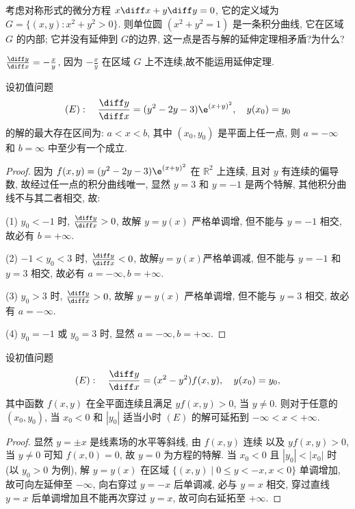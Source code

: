 \begin{exercise}
  考虑对称形式的微分方程 $x\diff x+y\diff y=0$,
  它的定义域为 $G=\{(x,y):x^2+y^2>0\}$. 则单位圆 $(x^2+y^2=1)$ 是一条积分曲线,
  它在区域 $G$ 的内部; 它并没有延伸到 $G$的边界, 这一点是否与解的延伸定理相矛盾?为什么?
\end{exercise}

\begin{solve}
  $\frac{\diff y}{\diff x}=-\frac{x}{y}$, 因为 $-\frac{x}{y}$ 在区域 $G$ 上不连续,故不能运用延伸定理.
\end{solve}



\begin{exercise}
  设初值问题
  \[(E):\quad \frac{\diff y}{\diff x}=(y^2-2y-3)\e^{(x+y)^2},\quad y(x_0)=y_0\]
  的解的最大存在区间为: $a<x<b$, 其中 $(x_0,y_0)$ 是平面上任一点,
  则 $a=-\infty$ 和 $b=\infty$ 中至少有一个成立.
\end{exercise}

\begin{proof}
  因为 $f(x,y)=(y^2-2y-3)\e^{(x+y)^2}$ 在 $\mathbb{R}^2$ 上连续,
  且对 $y$ 有连续的偏导数, 故经过任一点的积分曲线唯一, 显然 $y=3$ 和 $y=-1$ 是两个特解,
  其他积分曲线不与其二者相交, 故:

  (1) $y_0<-1$ 时, $\frac{\diff y}{\diff x}>0$, 故解 $y=y(x)$ 严格单调增, 
  但不能与 $y=-1$ 相交, 故必有 $b=+\infty$.

  (2) $-1<y_0<3$ 时, $\frac{\diff y}{\diff x}<0$, 故解$y=y(x)$严格单调减,
  但不能与 $y=-1$ 和 $y=3$ 相交, 故必有 $a=-\infty,b=+\infty$.

  (3) $y_0>3$ 时, $\frac{\diff y}{\diff x}>0$, 故解 $y=y(x)$ 严格单调增,
  但不能与 $y=3$ 相交, 故必有 $a=-\infty$.

  (4) $y_0=-1$ 或 $y_0=3$ 时, 显然 $a=-\infty,b=+\infty$.
\end{proof}



\begin{exercise}
  设初值问题
  \[(E):\quad \frac{\diff y}{\diff x}=(x^2-y^2)f(x,y),\quad y(x_0)=y_0,\]
  其中函数 $f(x,y)$ 在全平面连续且满足 $yf(x,y)>0$, 当 $y\neq 0$.
  则对于任意的 $(x_0,y_0)$,
  当 $x_0<0$ 和 $|y_0|$ 适当小时 $(E)$ 的解可延拓到 $-\infty<x<+\infty$.
\end{exercise}

\begin{proof}
  显然 $y=\pm x$ 是线素场的水平等斜线, 由 $f(x,y)$ 连续
  以及 $yf(x,y)>0$, 当 $y\neq 0$ 可知 $f(x,0)=0$,
  故 $y=0$ 为方程的特解. 当 $x_0<0$ 且 $|y_0|<|x_0|$ 时 (以 $y_0>0$ 为例),
  解 $y=y(x)$ 在区域 $\{(x,y)\mid 0\leq y<-x,x<0\}$ 单调增加, 故可向左延伸至 $-\infty$,
  向右穿过 $y=-x$ 后单调减, 必与 $y=x$ 相交, 
  穿过直线 $y=x$ 后单调增加且不能再次穿过 $y=x$, 故可向右延拓至 $+\infty$.
\end{proof}



